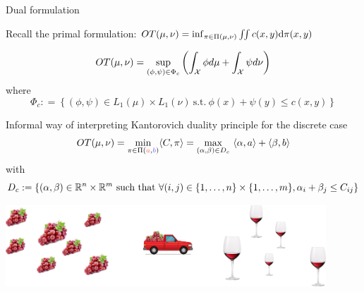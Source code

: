 \documentclass[pdf,aspectratio=169,10pt]{beamer}
\begin{document}
\begin{frame}{Dual formulation}

Recall the primal formulation: $OT({\mu},{\nu}) = \inf _{\pi\in\Pi(\mu,\nu)} \iint c(x,y){\text d}\pi(x,y)$
\begin{block}{}
$$OT({\mu},{\nu}) = \sup_{(\phi,\psi)\in\Phi_c} \left(\int_{{\mathcal X}} \phi d{\mu} + \int_{{\mathcal X}} \psi d{\nu}\right)$$
where
$$\Phi_c : = \left\{(\phi,\psi)\in L_1(\mu)\times L_1(\nu)\ \mbox{s.t.}\ \phi(x) + \psi(y)\leq c(x,y)\right\}$$
\end{block}



\end{frame}



\begin{frame}{Informal way of interpreting Kantorovich duality principle for the discrete case}
$$OT({\mu},{\nu}) = \underset{\pi\in\Pi(\er{a},\eb{b})}{\min} \langle C, \pi \rangle = \max_{(\alpha,\beta)\in D_c} \ \langle \alpha,{a}\rangle + \langle \beta, {b}\rangle$$
with
$$D_c := \{(\alpha,\beta)\in{\mathbb{R}}^n\times{\mathbb{R}}^m \ \mbox{such that}\ \forall (i,j)\in\{1,\ldots,n\}\times\{1,\ldots,m\}, \alpha_i+\beta_j\leq C_{ij}\}$$

\begin{center}
\includegraphics[width=0.9\textwidth]{../img/wine_load1.pdf}
\end{center}

\end{frame}
\end{document}
